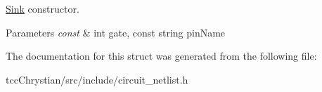 \hyperlink{structCircuit__Netlist_1_1Sink}{Sink} constructor. 


\begin{DoxyParams}{Parameters}
{\em const} & int gate, const string pin\-Name \\
\hline
\end{DoxyParams}


The documentation for this struct was generated from the following file\-:\begin{DoxyCompactItemize}
\item 
tcc\-Chrystian/src/include/circuit\-\_\-netlist.\-h\end{DoxyCompactItemize}
